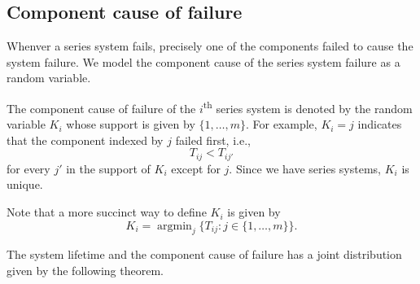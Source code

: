 \documentclass[
]{article}
\begin{document}
\hypertarget{sec:comp_cause}{%
\subsection{Component cause of failure}\label{sec:comp_cause}}

Whenver a series system fails, precisely one of the components failed to
cause the system failure. We model the component cause of the series
system failure as a random variable.

\begin{definition}
The component cause of failure of the $i$\textsuperscript{th} series system is
denoted by the random variable $K_i$ whose support is given by $\{1,\ldots,m\}$.
For example, $K_i=j$ indicates that the component indexed by $j$ failed first, i.e.,
$$
    T_{i j} < T_{i j'}
$$
for every $j'$ in the support of $K_i$ except for $j$.
Since we have series systems, $K_i$ is unique.
\end{definition}

Note that a more succinct way to define \(K_i\) is given by \[
K_i = \operatorname{argmin}_j \bigl\{ T_{i j} : j \in \{1,\ldots,m\}\bigr\}.
\]

The system lifetime and the component cause of failure has a joint
distribution given by the following theorem.
\end{document}
